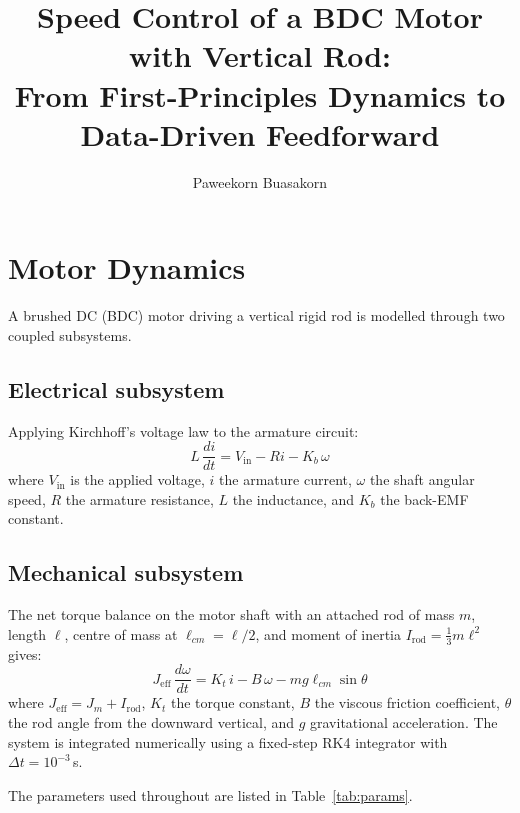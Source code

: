 \documentclass[10pt,twocolumn]{article}
\title{\textbf{Speed Control of a BDC Motor with Vertical Rod:\\
From First-Principles Dynamics to Data-Driven Feedforward}}
\author{Paweekorn Buasakorn}
\date{}
\begin{document}
\maketitle
\thispagestyle{empty}

\section{Motor Dynamics}

A brushed DC (BDC) motor driving a vertical rigid rod is modelled
through two coupled subsystems.

\subsection{Electrical subsystem}
Applying Kirchhoff's voltage law to the armature circuit:
\begin{equation}
  L\,\frac{di}{dt} = V_{\mathrm{in}} - Ri - K_b\,\omega
  \label{eq:elec}
\end{equation}
where $V_{\mathrm{in}}$ is the applied voltage, $i$ the armature
current, $\omega$ the shaft angular speed, $R$ the armature
resistance, $L$ the inductance, and $K_b$ the back-EMF constant.

\subsection{Mechanical subsystem}
The net torque balance on the motor shaft with an attached rod of
mass $m$, length $\ell$, centre of mass at $\ell_{cm}=\ell/2$, and
moment of inertia $I_{\mathrm{rod}}=\tfrac{1}{3}m\ell^{2}$ gives:
\begin{equation}
  J_{\mathrm{eff}}\,\frac{d\omega}{dt}
    = K_t\,i - B\,\omega - mg\ell_{cm}\sin\theta
  \label{eq:mech}
\end{equation}
where $J_{\mathrm{eff}}=J_m + I_{\mathrm{rod}}$, $K_t$ the torque
constant, $B$ the viscous friction coefficient, $\theta$ the rod angle
from the downward vertical, and $g$ gravitational acceleration.
The system is integrated numerically using a fixed-step RK4 integrator
with $\Delta t = 10^{-3}$\,s.

The parameters used throughout are listed in Table~\ref{tab:params}.
\end{document}
